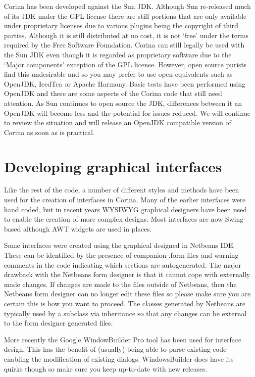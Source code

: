 Corina has been developed against the Sun JDK.  Although Sun re-released much of its JDK under the GPL license there are still portions that are only available under  proprietary licenses due to various plugins being the copyright of third parties.  Although it is still distributed at no cost, it is not `free' under the terms required by the Free Software Foundation.  Corina can still legally be used with the Sun JDK even though it is regarded as proprietary software due to the `Major components' exception of the GPL license.  However, open source purists find this undesirable and so you may prefer to use open equivalents such as OpenJDK, IcedTea or Apache Harmony.   Basic tests have been performed using OpenJDK and there are some aspects of the Corina code that still need attention.  As Sun continues to open source the JDK, differences between it an OpenJDK will become less and the potential for issues reduced.  We will continue to review the situation and will release an OpenJDK compatible version of Corina as soon as is practical.


\section{Developing graphical interfaces}
Like the rest of the code, a number of different styles and methods have been used for the creation of interfaces in Corina.  Many of the earlier interfaces were hand coded, but in recent years WYSIWYG graphical designers have been used to enable the creation of more complex designs.  Most interfaces are now Swing-based although AWT widgets are used in places.

Some interfaces were created using the graphical designed in Netbeans IDE.  These can be identified by the presence of companion .form files and warning comments in the code indicating which sections are autogenerated.  The major drawback with the Netbeans form designer is that it cannot cope with externally made changes.   If changes are made to the files outside of Netbeans, then the Netbeans form designer can no longer edit these files so please make sure you are certain this is how you want to proceed.  The classes generated by Netbeans are typically used by a subclass via inheritance so that any changes can be external to the form designer generated files. 

More recently the Google WindowBuilder Pro tool has been used for interface design.  This has the benefit of (usually) being able to parse existing code enabling the modification of existing dialogs.  WindowsBuilder does have its quirks though so make sure you keep up-to-date with new releases.

